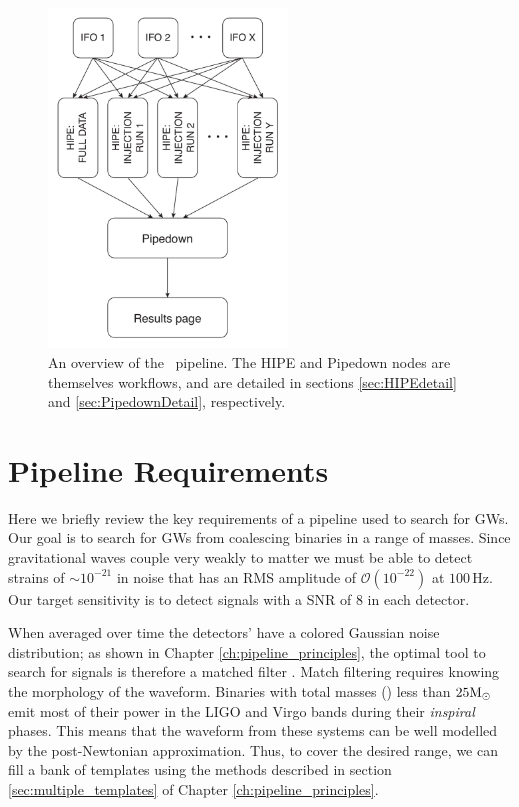 \begin{figure}[h]
\center
\includegraphics[width=2.5in]{figures/ihopeOverview.pdf}
\caption{
An overview of the \ihope~pipeline. The HIPE and Pipedown nodes are themselves
workflows, and are detailed in sections \ref{sec:HIPEdetail} and
\ref{sec:PipedownDetail}, respectively. 
}
\label{fig:ihopeOverview}
\end{figure}

\section{Pipeline Requirements}
\label{sec:PipelineRequirements}

Here we briefly review the key requirements of a pipeline used to search for
\ac{GW}s. Our goal is to search for \ac{GW}s from coalescing binaries in a
range of masses. Since gravitational waves couple very weakly to matter we must
be able to detect strains of $\sim10^{-21}$ in noise that has an RMS amplitude
of $\mathcal{O}(10^{-22})$ at $100\,$Hz. Our target sensitivity is to detect
signals with a \ac{SNR} of $8$ in each detector.

When averaged over time the detectors' have a colored Gaussian noise
distribution; as shown in Chapter \ref{ch:pipeline_principles}, the optimal tool
to search for signals is therefore a matched filter \cite{Brown}. Match
filtering requires knowing the morphology of the waveform. Binaries with total
masses (\mtotal) less than $25\mathrm{M_\odot}$ emit most of their power in the \ac{LIGO}
and Virgo bands during their {\it inspiral} phases.  This means that the
waveform from these systems can be well modelled by the post-Newtonian
approximation. Thus, to cover the desired range,
we can fill a bank of templates using the methods described in section
\ref{sec:multiple_templates} of Chapter \ref{ch:pipeline_principles}.

